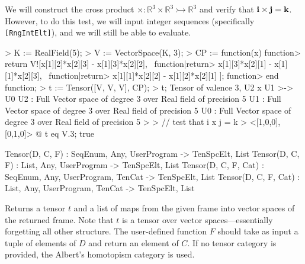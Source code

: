 \begin{example}[BBCrossProduct]

We will construct the cross product $\times : \mathbb{R}^3\times \mathbb{R}^3\rightarrowtail \mathbb{R}^3$ and verify that ${\bf i}\times {\bf j} = {\bf k}$.
However, to do this test, we will input integer sequences (specifically \texttt{[RngIntElt]}), and we will still be able to evaluate.
\begin{code}
> K := RealField(5);
> V := VectorSpace(K, 3);
> CP := function(x)
function>   return V![x[1][2]*x[2][3] - x[1][3]*x[2][2], \
function|return>     x[1][3]*x[2][1] - x[1][1]*x[2][3], \
function|return>     x[1][1]*x[2][2] - x[1][2]*x[2][1] ];
function> end function;
> t := Tensor([V, V, V], CP);
> t;
Tensor of valence 3, U2 x U1 >-> U0
U2 : Full Vector space of degree 3 over Real field of precision 5
U1 : Full Vector space of degree 3 over Real field of precision 5
U0 : Full Vector space of degree 3 over Real field of precision 5
> 
> // test that i x j = k
> <[1,0,0], [0,1,0]> @ t eq V.3;
true
\end{code}
\end{example}

\begin{intrinsics}
Tensor(D, C, F) : SeqEnum, Any, UserProgram -> TenSpcElt, List
Tensor(D, C, F) : List, Any, UserProgram -> TenSpcElt, List
Tensor(D, C, F, Cat) : SeqEnum, Any, UserProgram, TenCat -> TenSpcElt, List
Tensor(D, C, F, Cat) : List, Any, UserProgram, TenCat -> TenSpcElt, List
\end{intrinsics}

Returns a tensor $t$ and a list of maps from the given frame into vector spaces of the returned frame.
Note that $t$ is a tensor over vector spaces---essentially forgetting all other structure.
The user-defined function $F$ should take as input a tuple of elements of $D$ and return an element of $C$.
If no tensor category is provided, the Albert's homotopism category is used.

